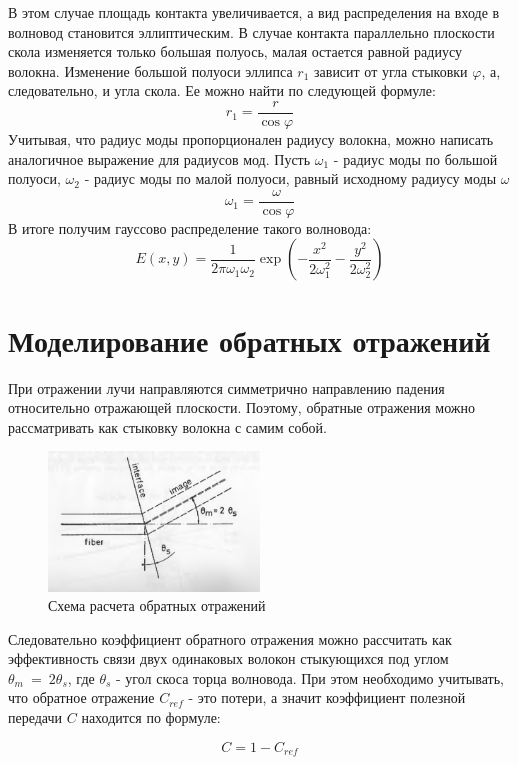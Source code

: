 В этом случае площадь контакта увеличивается, а вид распределения на входе в волновод становится эллиптическим. В случае контакта параллельно плоскости скола изменяется только большая полуось, малая остается равной радиусу волокна. Изменение большой полуоси эллипса $r_1$ зависит от угла стыковки $\varphi$, а, следовательно, и угла скола. Ее можно найти по следующей формуле:
\begin{equation}
	r_1 = \frac{r}{\cos \varphi}
\end{equation}
Учитывая, что радиус моды пропорционален радиусу волокна, можно написать аналогичное выражение для радиусов мод. Пусть $\omega_1$ - радиус моды по большой полуоси, $\omega_2$ - радиус моды по малой полуоси, равный исходному радиусу моды $\omega$
\begin{equation}
	\omega_1 = \frac{\omega}{\cos \varphi}
	\label{ellipse_axis}
\end{equation}
В итоге получим гауссово распределение такого волновода:
\begin{equation}
  E(x,y)=\frac{1}{2\pi\omega_1\omega_2}\exp\left(-\frac{x^2}{2\omega_1^2}-\frac{y^2}{2\omega_2^2}\right)
\end{equation}

\section{Моделирование обратных отражений}

При отражении лучи направляются симметрично направлению падения относительно отражающей плоскости. Поэтому, обратные отражения можно рассматривать как стыковку волокна с самим собой.

\begin{figure}[h!]
	\includegraphics[width=0.5\textwidth]{img/backreflection_scheme.png}
	\caption{Схема расчета обратных отражений}
\end{figure}

Следовательно коэффициент обратного отражения можно рассчитать как эффективность связи двух одинаковых волокон стыкующихся под углом $\theta_m~=~2\theta_s$, где $\theta_s$ - угол скоса торца волновода. При этом необходимо учитывать, что обратное отражение $C_{ref}$ - это потери, а значит коэффициент полезной передачи $C$ находится по формуле:

\begin{equation}
	C = 1 - C_{ref}
\end{equation}
